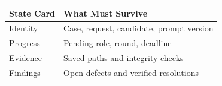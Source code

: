 \begin{tabular}{@{}P{4.0cm}P{8.5cm}@{}}
\toprule
\textbf{State Card} & \textbf{What Must Survive} \\
\midrule
Identity & Case, request, candidate, prompt version \\
Progress & Pending role, round, deadline \\
Evidence & Saved paths and integrity checks \\
Findings & Open defects and verified resolutions \\
\bottomrule
\end{tabular}
